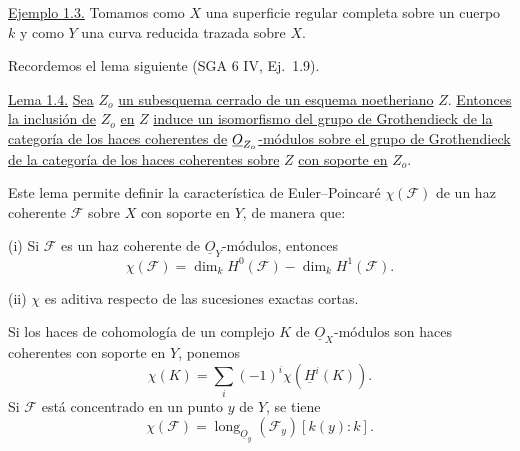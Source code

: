 \medskip
\noindent\underline{Ejemplo 1.3.}
Tomamos como $X$ una superficie regular completa sobre un cuerpo $k$ y como
$Y$ una curva reducida trazada sobre $X$.

Recordemos el lema siguiente (SGA 6 IV, Ej.~1.9).

\medskip
\noindent\underline{Lema 1.4.}
\underline{Sea} $Z_o$ \underline{un subesquema cerrado de un esquema
noetheriano} $Z$. \underline{Entonces la inclusión de} $Z_o$ \underline{en}
$Z$ \underline{induce un isomorfismo del grupo de Grothendieck de la categoría
de los haces coherentes de} $\sisi{O_{\mathbb{Z}_o}}{\underline{O}_{Z_o}}$\underline{-módulos sobre el
grupo de Grothendieck de la categoría de los haces coherentes sobre} $Z$
\underline{con soporte en} $Z_o$.

Este lema permite definir la característica de Euler--Poincaré
$\chi(\mathcal F)$ de un haz coherente $\mathcal F$ sobre $X$ con soporte en
$Y$, de manera que:

\medskip
\noindent (i) Si $\mathcal F$ es un haz coherente de
$\underline{O}_Y$-módulos, entonces
\begin{equation}\tag{1.4.1}
\chi(\mathcal F)=\dim_k H^0(\mathcal F)-\dim_k H^1(\mathcal F).
\end{equation}

\noindent (ii) $\chi$ es aditiva respecto de las sucesiones exactas cortas.

Si los haces de cohomología de un complejo $K$ de
$\underline{O}_X$-módulos son haces coherentes con soporte en $Y$, ponemos
\begin{equation}\tag{1.4.2}
\chi(K)=\sum_i(-1)^i\chi(\underline{H}^i(K)).
\end{equation}
Si $\mathcal F$ está concentrado en un punto $y$ de $Y$, se tiene
\begin{equation}\tag{1.4.3}
\chi(\mathcal F)=\operatorname{long}_{\underline{O}_y}(\mathcal F_y)
[k(y):k].
\end{equation}

\pageoriginale

